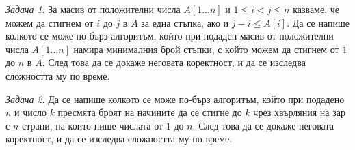 \documentclass{article}
\theoremstyle{definition}
\theoremstyle{plain}
\theoremstyle{remark}
\newtheorem{problem}{Задача}
\theoremstyle{definition}
\begin{document}
\begin{problem}
За масив от положителни числа $A[1 \dots n]$ и $1 \leq i < j \leq n$ казваме, че можем да стигнем от $i$ до $j$ в $A$ за една стъпка, ако и $j - i \leq A[i]$.
Да се напише колкото се може по-бърз алгоритъм, който при подаден масив от положителни числа $A[1 \dots n]$ намира минималния брой стъпки, с който можем да стигнем от $1$ до $n$ в $A$.
След това да се докаже неговата коректност, и да се изследва сложността му по време.
\end{problem}

\begin{problem}
Да се напише колкото се може по-бърз алгоритъм, който при подадено $n$ и число $k$ пресмята броят на начините да се стигне до $k$ чрез хвърляния на зар с $n$ страни, на които пише числата от $1$ до $n$.
След това да се докаже неговата коректност, и да се изследва сложността му по време.
\end{problem}
\end{document}
